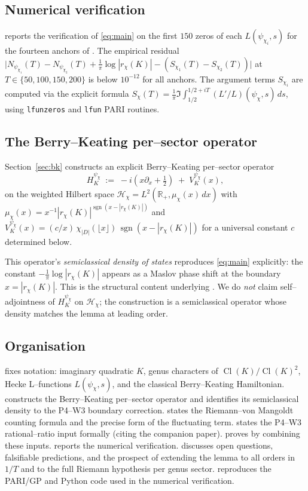 \documentclass[11pt]{amsart}
\theoremstyle{definition}
\theoremstyle{remark}
\DeclareMathOperator{\Cl}{Cl}
\DeclareMathOperator{\sgn}{sgn}
\newcommand{\R}{\mathbb{R}}
\begin{document}
\subsection{Numerical verification}\label{ssec:num-intro}
 reports the verification of \eqref{eq:main} on
the first \(150\) zeros of each \(L(\psi_{\chi_i}, s)\) for the
fourteen anchors of . The empirical residual
\(\bigl| N_{\psi_{\chi_1}}(T) - N_{\psi_{\chi_2}}(T) +
\tfrac{1}{\pi}\log|r_\chi(K)| - (S_{\chi_1}(T) - S_{\chi_2}(T)) \bigr|\)
at \(T \in \{50, 100, 150, 200\}\) is below \(10^{-12}\) for all
anchors. The argument terms \(S_{\chi_i}\) are computed via the
explicit formula \(S_\chi(T) = \tfrac{1}{\pi}
\Im\!\int_{1/2}^{1/2 + iT} (L'/L)(\psi_\chi, s)\, ds\), using
\texttt{lfunzeros} and \texttt{lfun} PARI routines.

\subsection{The Berry--Keating per--sector operator}\label{ssec:bk-intro}
Section~\ref{sec:bk} constructs an explicit Berry--Keating per--sector
operator
\[
   H_K^{\psi_\chi}
   \;:=\;
   -i\!\left( x \partial_x + \tfrac{1}{2} \right)
   \;+\; V_K^{\psi_\chi}(x) ,
\]
on the weighted Hilbert space
\(\mathcal H_\chi = L^2(\R_+, \mu_\chi(x)\,dx)\) with
\(\mu_\chi(x) = x^{-1} |r_\chi(K)|^{\sgn(x - |r_\chi(K)|)}\) and
\(V_K^{\psi_\chi}(x) = (c/x)\,\chi_{|D|}(\lfloor x \rfloor)\,
\sgn(x - |r_\chi(K)|)\) for a universal constant \(c\) determined below.

This operator's \emph{semiclassical density of states} reproduces
\eqref{eq:main} explicitly: the constant
\(-\tfrac{1}{\pi}\log|r_\chi(K)|\) appears as a Maslov phase shift
at the boundary \(x = |r_\chi(K)|\). This is the structural
content underlying . We do
\emph{not} claim self--adjointness of \(H_K^{\psi_\chi}\) on
\(\mathcal H_\chi\); the construction is a semiclassical operator whose
density matches the lemma at leading order.

\subsection{Organisation}\label{ssec:org}
 fixes notation: imaginary quadratic \(K\), genus
characters of \(\Cl(K)/\Cl(K)^2\), Hecke L--functions
\(L(\psi_\chi, s)\), and the classical Berry--Keating Hamiltonian.
 constructs the Berry--Keating per--sector
operator and identifies its semiclassical density to the
P4--W3 boundary correction.  states the
Riemann--von Mangoldt counting formula and the precise form of the
fluctuating term.  states the P4--W3 rational--ratio
input formally (citing the companion paper). 
proves  by combining these inputs. 
reports the numerical verification.  discusses open
questions, falsifiable predictions, and the prospect of extending the
lemma to all orders in \(1/T\) and to the full Riemann hypothesis per
genus sector.  reproduces the PARI/GP and Python code
used in the numerical verification.
\end{document}
